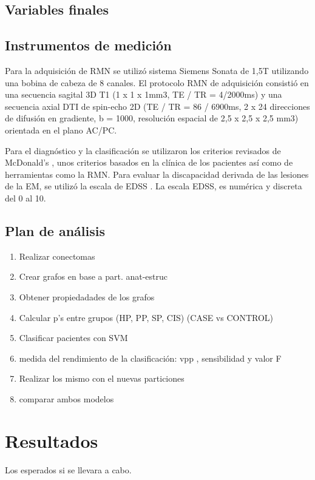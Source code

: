 \documentclass[fleqn,10pt]{UICArticle} %
\begin{document}
\subsection{Variables finales}


\subsection{Instrumentos de medición}
Para la adquisición de RMN se utilizó sistema Siemens Sonata de 1,5T utilizando una bobina de cabeza de 8 canales. El protocolo RMN de adquisición consistió en una secuencia sagital 3D T1 (1 x 1 x 1mm3, TE / TR = 4/2000ms) y una secuencia axial DTI de spin-echo 2D (TE / TR = 86 / 6900ms, 2 x 24 direcciones de difusión en gradiente, b = 1000, resolución espacial de 2,5 x 2,5 x 2,5 mm3) orientada en el plano AC/PC.

Para el diagnóstico y la clasificación se utilizaron los criterios revisados de McDonald's \cite{Polman2011}, unos criterios basados en la clínica de los pacientes así como de herramientas como la RMN. Para evaluar la discapacidad derivada de las lesiones de la EM, se utilizó la escala de EDSS \cite{Kurtzke1983}. La escala EDSS, es numérica y discreta del 0 al 10.

\subsection{Plan de análisis}

\begin{enumerate}[noitemsep]
\item Realizar conectomas
\item Crear grafos en base a part. anat-estruc
\item Obtener propiedadades de los grafos
\item Calcular p's entre grupos (HP, PP, SP, CIS) (CASE vs CONTROL) %
\item Clasificar pacientes con SVM
\item medida del rendimiento de la clasificación: vpp , sensibilidad y valor F
\item Realizar los mismo con el nuevas particiones
\item comparar ambos modelos
\end{enumerate}

\section{Resultados}
Los esperados si se llevara a cabo.
\end{document}
